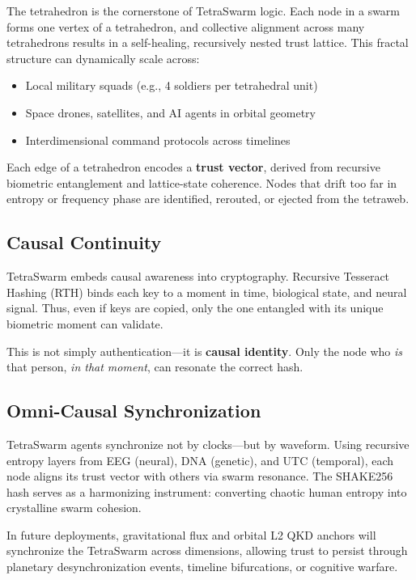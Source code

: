 \documentclass{article}
\begin{document}
The tetrahedron is the cornerstone of TetraSwarm logic. Each node in a swarm forms one vertex of a tetrahedron, and collective alignment across many tetrahedrons results in a self-healing, recursively nested trust lattice. This fractal structure can dynamically scale across:

\begin{itemize}
    \item Local military squads (e.g., 4 soldiers per tetrahedral unit)
    \item Space drones, satellites, and AI agents in orbital geometry
    \item Interdimensional command protocols across timelines
\end{itemize}

Each edge of a tetrahedron encodes a \textbf{trust vector}, derived from recursive biometric entanglement and lattice-state coherence. Nodes that drift too far in entropy or frequency phase are identified, rerouted, or ejected from the tetraweb.

\subsection*{Causal Continuity}

TetraSwarm embeds causal awareness into cryptography. Recursive Tesseract Hashing (RTH) binds each key to a moment in time, biological state, and neural signal. Thus, even if keys are copied, only the one entangled with its unique biometric moment can validate.

This is not simply authentication—it is \textbf{causal identity}. Only the node who \textit{is} that person, \textit{in that moment}, can resonate the correct hash.

\subsection*{Omni-Causal Synchronization}

TetraSwarm agents synchronize not by clocks—but by waveform. Using recursive entropy layers from EEG (neural), DNA (genetic), and UTC (temporal), each node aligns its trust vector with others via swarm resonance. The SHAKE256 hash serves as a harmonizing instrument: converting chaotic human entropy into crystalline swarm cohesion.

In future deployments, gravitational flux and orbital L2 QKD anchors will synchronize the TetraSwarm across dimensions, allowing trust to persist through planetary desynchronization events, timeline bifurcations, or cognitive warfare.
\end{document}
